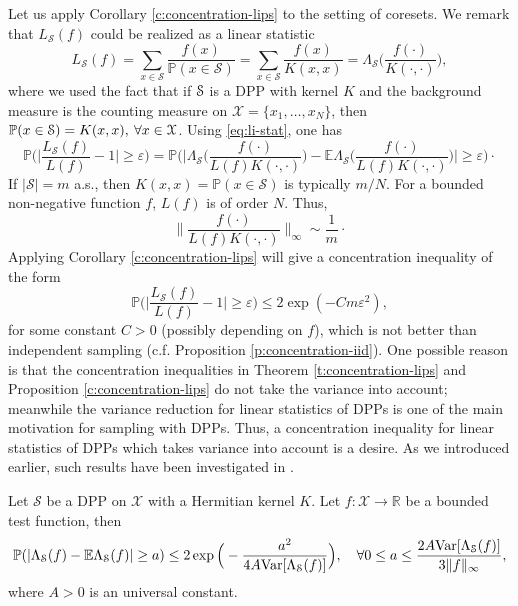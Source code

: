 Let us apply Corollary \ref{c:concentration-lips} to the setting of coresets. We remark that $L_{\mathcal S}(f)$ could be realized as a linear statistic
\begin{equation} \label{eq:li-stat}
    L_{\mathcal S}(f) = \sum_{x\in \mathcal S} \frac{f(x)}{\mathbb P(x\in \mathcal S)} 
    = \sum_{x\in \mathcal S} \frac{f(x)}{K(x,x)} 
    = \Lambda_{\mathcal S}\Big ( \frac{f(\cdot)}{K(\cdot,\cdot)}\Big ) ,
\end{equation}
where we used the fact that if $\mathcal{S}$ is a DPP with kernel $K$ and the background measure is the counting measure on $\mathcal X = \{x_1,\ldots,x_N\}$, then $\mathbb P(x\in \mathcal{S}) = K(x,x), \: \forall x\in \mathcal X$.
Using \eqref{eq:li-stat}, one has
\begin{equation} \label{eq:coreset-linearstat}
    \mathbb P \Big (\Big |\frac{L_{\mathcal S}(f)}{L(f)}-1\Big | \ge \varepsilon \Big ) 
= \mathbb P \Big (\Big | \Lambda_{\mathcal S}\Big (\frac{f(\cdot)}{L(f) K(\cdot,\cdot)} \Big ) - \mathbb E \Lambda_{\mathcal S}\Big (\frac{f(\cdot)}{L(f)K(\cdot,\cdot)} \Big ) \Big | \ge \varepsilon \Big ) \cdot
\end{equation}
If $|\mathcal S| = m$ a.s., then $K(x,x)=\mathbb P(x \in \mathcal S)$ is typically $m/N$. For a bounded non-negative function $f$, $L(f)$ is of order $N$. Thus,
\[ \Big \| \frac{f(\cdot)}{L(f) K(\cdot,\cdot)}  \Big \|_\infty \sim \frac{1}{m} \cdot \]
Applying Corollary \ref{c:concentration-lips} will give a concentration inequality of the form
\begin{equation} \label{eq:concentration-coreset-iid}
    \mathbb P \Big (\Big |\frac{L_{\mathcal S}(f)}{L(f)}-1\Big | \ge \varepsilon \Big ) \le 2 \exp (-Cm\varepsilon^2 ),
\end{equation}
for some constant $C>0$ (possibly depending on $f$), which is not better than independent sampling (c.f. Proposition \ref{p:concentration-iid}). One possible reason is that the concentration inequalities in Theorem \ref{t:concentration-lips} and Proposition \ref{c:concentration-lips} do not take the variance into account; meanwhile the variance reduction for linear statistics of DPPs is one of the main motivation for sampling with DPPs.
Thus, a concentration inequality for linear statistics of DPPs which takes variance into account is a desire. As we introduced earlier, such results have been investigated in \cite{BREUER2014441, NIPS2024}. 
\begin{theorem}\label{t:concentration-dpp}
    Let $\mathcal S$ be a DPP on $\mathcal X$ with a Hermitian kernel $K$. Let $f:\mathcal X \rightarrow \mathbb R$ be a bounded test function, then
    \[ \mathbb P(|\Lambda_{\mathcal S}(f) - \mathbb E \Lambda_{\mathcal S}(f) | \ge a ) \le 2 \exp \Big ( - \frac{a^2}{4A\mathrm{Var}[\Lambda_{\mathcal S}(f)]} \Big ), \quad \forall 0 \le a \le \frac{2A \mathrm{Var}[\Lambda_{\mathcal S}(f)]}{3\|f\|_\infty}, \]
    where $A>0$ is an universal constant.
\end{theorem}

